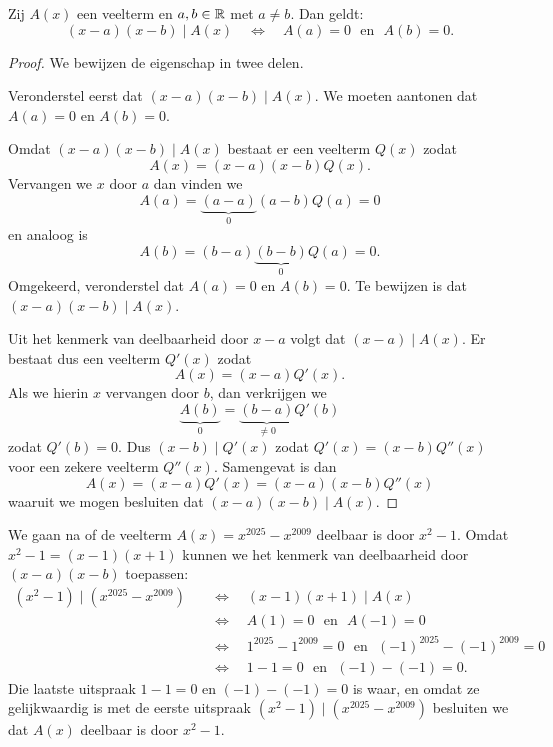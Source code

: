 \documentclass{ximera}
\begin{document}
\begin{theorem} 
Zij $A(x)$ een veelterm en $a,b \in \mathbb{R}$ met $a \neq b$. Dan geldt:
\[
(x-a)(x-b) \mid A(x) \quad \Leftrightarrow \quad A(a) = 0 \,\, \text{ en } \,\, A(b) = 0.
\]
\end{theorem} 
\begin{Uitbreiding}

  
\begin{proof}

We bewijzen de eigenschap in twee delen.

Veronderstel eerst dat $(x-a)(x-b) \mid A(x)$. We moeten aantonen dat $A(a) = 0$ en $A(b) = 0$.

Omdat $(x-a)(x-b) \mid A(x)$ bestaat er een veelterm $Q(x)$ zodat
\[
A(x) = (x-a)(x-b)Q(x).
\]
Vervangen we $x$ door $a$ dan vinden we 
\[
A(a) = \underbrace{(a-a)}_{0}(a-b)Q(a) = 0
\]
en analoog is
\[
A(b) = (b-a)\underbrace{(b-b)}_{0}Q(a) = 0.
\]
Omgekeerd, veronderstel dat $A(a) = 0$ en $A(b) = 0$. Te bewijzen is dat $(x-a)(x-b) \mid A(x)$.

Uit het kenmerk van deelbaarheid door $x-a$ volgt dat $(x-a) \mid A(x)$. Er bestaat dus een veelterm $Q'(x)$ zodat
\[
A(x) = (x-a)Q'(x).
\]
Als we hierin $x$ vervangen door $b$, dan verkrijgen we 
\[
\underbrace{A(b)}_{0} = \underbrace{(b - a)}_{\neq 0} Q'(b)
\]
zodat $Q'(b) = 0$. Dus $(x-b) \mid Q'(x)$ zodat $Q'(x) = (x-b)Q''(x)$ voor een zekere veelterm $Q''(x)$. Samengevat is dan
\[
A(x) = (x-a)Q'(x) = (x-a)(x-b)Q''(x)
\]
waaruit we mogen besluiten dat $(x-a)(x-b) \mid A(x)$.

\end{proof}

\end{Uitbreiding}

\begin{example} 
We gaan na of de veelterm $A(x) = x^{2025} - x^{2009}$ deelbaar is door $x^2 - 1$. Omdat $x^2-1 = (x-1)(x+1)$ kunnen we het kenmerk van deelbaarheid door $(x-a)(x-b)$ toepassen:
\begin{align*}
(x^2-1) \mid (x^{2025} - x^{2009}) \quad 
& \Leftrightarrow \quad (x-1)(x+1) \mid A(x) \\
& \Leftrightarrow \quad A(1) = 0 \,\, \text{ en } \,\, A(-1) = 0 \\
& \Leftrightarrow \quad 1^{2025} - 1^{2009} = 0 \,\, \text{ en } \,\, (-1)^{2025} - (-1)^{2009} = 0 \\
& \Leftrightarrow \quad 1 - 1 = 0 \,\, \text{ en } \,\, (-1) - (-1) = 0.
\end{align*}
Die laatste uitspraak $1 - 1 = 0$ en $(-1) - (-1) = 0$ is waar, en omdat ze gelijkwaardig is met de eerste uitspraak $(x^2-1) \mid (x^{2025} - x^{2009})$ besluiten we dat $A(x)$ deelbaar is door $x^2-1$. 
\end{example} 
\end{document}
